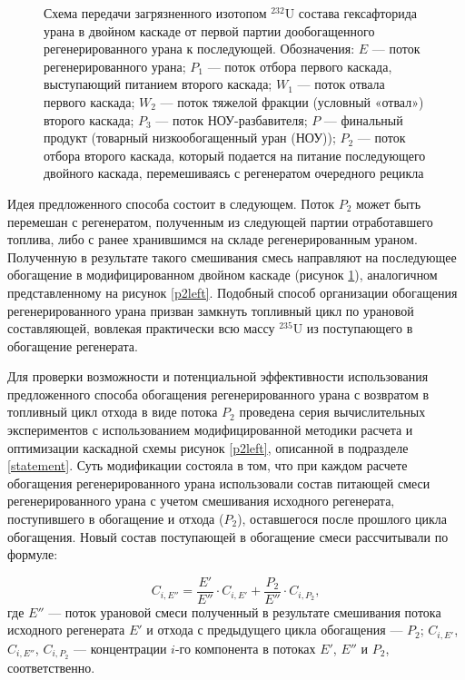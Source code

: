 \begin{figure}[ht]
    \caption{Схема передачи загрязненного изотопом $^{232}$U состава гексафторида урана в двойном каскаде от первой партии дообогащенного регенерированного урана к последующей. Обозначения: $E$ --- поток регенерированного урана; $P_1$ --- поток отбора первого каскада, выступающий питанием второго каскада; $W_1$ --- поток отвала первого каскада; $W_2$ --- поток тяжелой фракции (условный «отвал») второго каскада; $P_3$ --- поток НОУ-разбавителя; $P$ --- финальный продукт (товарный низкообогащенный уран (НОУ)); $P_2$ --- поток отбора второго каскада, который подается на питание последующего двойного каскада, перемешиваясь с регенератом очередного рецикла}\label{P2utilizationRing}
\end{figure}

Идея предложенного способа состоит в следующем. Поток $P_2$ может быть перемешан с регенератом, полученным из следующей партии отработавшего топлива, либо с ранее хранившимся на складе регенерированным ураном. Полученную в результате такого смешивания смесь направляют на последующее обогащение в модифицированном двойном каскаде (рисунок \ref{P2utilizationRing}), аналогичном представленному на рисунок \ref{p2left}. Подобный способ организации обогащения регенерированного урана призван замкнуть топливный цикл по урановой составляющей, вовлекая практически всю массу $^{235}$U из поступающего в обогащение регенерата.

Для проверки возможности и потенциальной эффективности использования предложенного способа обогащения регенерированного урана с возвратом в топливный цикл отхода в виде потока $P_2$ проведена серия вычислительных экспериментов с использованием модифицированной методики расчета и оптимизации каскадной схемы рисунок \ref{p2left}, описанной в подразделе \ref{statement}. Суть модификации состояла в том, что при каждом расчете обогащения регенерированного урана использовали состав питающей смеси регенерированного урана с учетом смешивания исходного регенерата, поступившего в обогащение и отхода ($P_2$), оставшегося после прошлого цикла обогащения. Новый состав поступающей в обогащение смеси рассчитывали по формуле:

\begin{equation} \label{Cie} 
    C_{i,E''}=\frac{E'}{E''} \cdot {C_{i,{E'}}} + \frac{P_2}{E''} \cdot {C_{i,{P_2}}},
\end{equation}
где $E''$ --- поток урановой смеси полученный в результате смешивания потока исходного регенерата $E'$ и отхода с предыдущего цикла обогащения --- $P_2$; $C_{i,E'}$, $C_{i,E''}$, $C_{i,{P_2}}$ --- концентрации $i$-го компонента в потоках $E'$, $E''$ и $P_2$, соответственно.     

